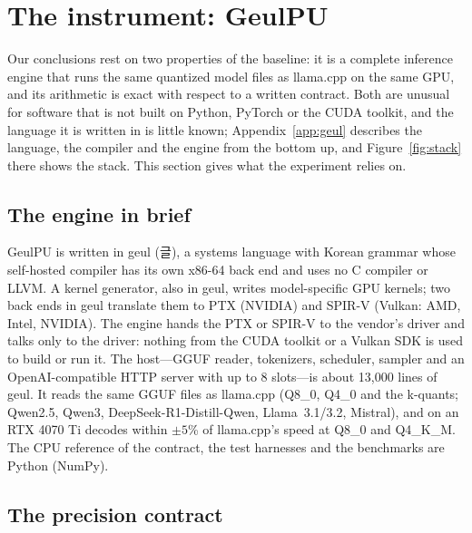 \documentclass[11pt]{article}
\begin{document}
\section{The instrument: GeulPU}\label{sec:instrument}

Our conclusions rest on two properties of the baseline: it is a complete inference engine that runs the same quantized model
files as llama.cpp on the same GPU, and its arithmetic is exact with respect to a written contract. Both are unusual for
software that is not built on Python, PyTorch or the CUDA toolkit, and the language it is written in is little known;
Appendix~\ref{app:geul} describes the language, the compiler and the engine from the bottom up, and Figure~\ref{fig:stack}
there shows the stack. This section gives what the experiment relies on.

\subsection{The engine in brief}\label{sec:brief}

GeulPU is written in geul (글), a systems language with Korean grammar whose self-hosted compiler has its own x86-64 back end
and uses no C compiler or LLVM. A kernel generator, also in geul, writes model-specific GPU kernels; two back ends in geul
translate them to PTX (NVIDIA) and SPIR-V (Vulkan: AMD, Intel, NVIDIA). The engine hands the PTX or SPIR-V to the vendor's
driver and talks only to the driver: nothing from the CUDA toolkit or a Vulkan SDK is used to build or run it. The
host---GGUF reader, tokenizers, scheduler, sampler and an OpenAI-compatible HTTP server with up to 8 slots---is about 13,000
lines of geul. It reads the same GGUF files as llama.cpp (Q8\_0, Q4\_0 and the k-quants; Qwen2.5, Qwen3,
DeepSeek-R1-Distill-Qwen, Llama~3.1/3.2, Mistral), and on an RTX 4070 Ti decodes within $\pm5$\% of llama.cpp's speed at
Q8\_0 and Q4\_K\_M. The CPU reference of the contract, the test harnesses and the benchmarks are Python (NumPy).

\subsection{The precision contract}\label{sec:contract}
\end{document}

